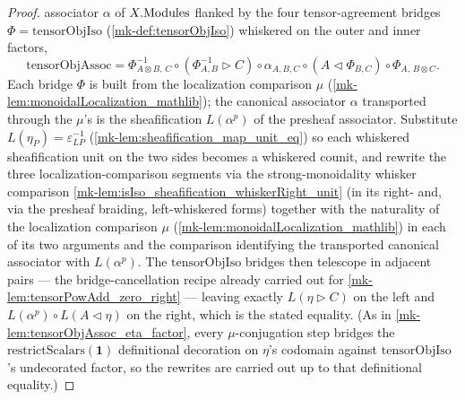 \begin{proof}
  associator \(\alpha\) of \(X.\mathrm{Modules}\) flanked by the four tensor-agreement
  bridges \(\Phi = \mathrm{tensorObjIso}\) (\ref{mk-def:tensorObjIso}) whiskered on the
  outer and inner factors,
  \[
    \mathrm{tensorObjAssoc} = \Phi^{-1}_{A\otimes B,\,C}
      \circ (\Phi^{-1}_{A,B} \rhd C) \circ \alpha_{A,B,C}
      \circ (A \lhd \Phi_{B,C}) \circ \Phi_{A,\,B\otimes C}.
  \]
  Each bridge \(\Phi\) is built from the localization comparison \(\mu\)
  (\ref{mk-lem:monoidalLocalization_mathlib}); the canonical associator \(\alpha\)
  transported through the \(\mu\)'s is the sheafification \(L(\alpha^{p})\) of the
  presheaf associator. Substitute \(L(\eta_P) = \varepsilon_{LP}^{-1}\)
  (\ref{mk-lem:sheafification_map_unit_eq}) so each whiskered sheafification unit on the
  two sides becomes a whiskered counit, and rewrite the three localization-comparison
  segments via the strong-monoidality whisker comparison
  \ref{mk-lem:isIso_sheafification_whiskerRight_unit} (in its right- and, via the
  presheaf braiding, left-whiskered forms) together with the naturality of the
  localization comparison \(\mu\) (\ref{mk-lem:monoidalLocalization_mathlib}) in each of
  its two arguments and the comparison identifying the transported canonical associator
  with \(L(\alpha^{p})\). The \(\mathrm{tensorObjIso}\) bridges
  then telescope in adjacent pairs --- the bridge-cancellation recipe already carried
  out for \ref{mk-lem:tensorPowAdd_zero_right} --- leaving exactly
  \(L(\eta \rhd C)\) on the left and \(L(\alpha^{p}) \circ L(A \lhd \eta)\) on the
  right, which is the stated equality. (As in \ref{mk-lem:tensorObjAssoc_eta_factor},
  every \(\mu\)-conjugation step bridges the
  \(\mathrm{restrictScalars}(\mathbf{1})\) definitional decoration on \(\eta\)'s
  codomain against \(\mathrm{tensorObjIso}\)'s undecorated factor, so the rewrites are
  carried out up to that definitional equality.)
\end{proof}

